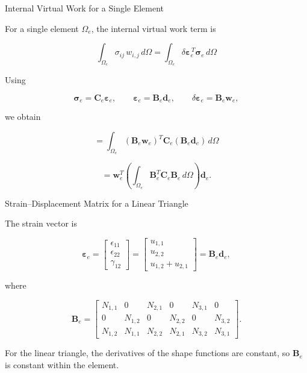 \documentclass[aspectratio=169]{beamer}
\begin{document}
\begin{frame}{Internal Virtual Work for a Single Element}

For a single element \( \Omega_e \), the internal virtual work term is

\[
\int_{\Omega_e} \sigma_{ij}\, w_{i,j}\, d\Omega
=
\int_{\Omega_e}
\delta\boldsymbol{\varepsilon}_e^{\,T}\boldsymbol{\sigma}_e
\, d\Omega
\]

Using

\[
\boldsymbol{\sigma}_e=\mathbf{C}_e\boldsymbol{\varepsilon}_e,
\qquad
\boldsymbol{\varepsilon}_e=\mathbf{B}_e\mathbf{d}_e,
\qquad
\delta\boldsymbol{\varepsilon}_e=\mathbf{B}_e\mathbf{w}_e,
\]

we obtain



\[
=
\int_{\Omega_e}
(\mathbf{B}_e\mathbf{w}_e)^T
\mathbf{C}_e
(\mathbf{B}_e\mathbf{d}_e)
\, d\Omega
\]

\[
=
\mathbf{w}_e^T
\left(
\int_{\Omega_e}
\mathbf{B}_e^T \mathbf{C}_e \mathbf{B}_e
\, d\Omega
\right)
\mathbf{d}_e.
\]

\end{frame}



\begin{frame}{Strain--Displacement Matrix for a Linear Triangle}

The strain vector is

\[
\boldsymbol{\varepsilon}_e=
\begin{bmatrix}
\epsilon_{11}\\
\epsilon_{22}\\
\gamma_{12}
\end{bmatrix}
=
\begin{bmatrix}
u_{1,1}\\
u_{2,2}\\
u_{1,2}+u_{2,1}
\end{bmatrix}
=
\mathbf{B}_e\mathbf{d}_e,
\]

where

\[
\mathbf{B}_e=
\begin{bmatrix}
N_{1,1} & 0       & N_{2,1} & 0       & N_{3,1} & 0\\
0       & N_{1,2} & 0       & N_{2,2} & 0       & N_{3,2}\\
N_{1,2} & N_{1,1} & N_{2,2} & N_{2,1} & N_{3,2} & N_{3,1}
\end{bmatrix}.
\]

For the linear triangle, the derivatives of the shape functions are constant,
so \(\mathbf{B}_e\) is constant within the element.

\end{frame}
\end{document}
